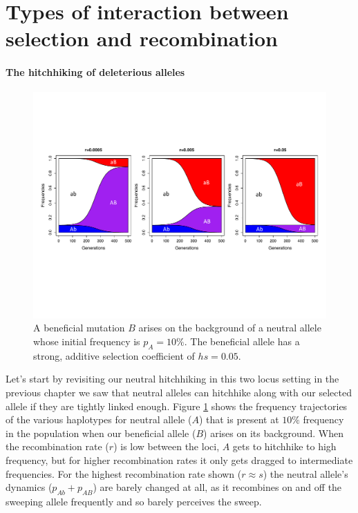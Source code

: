 \section{Types of interaction between selection and recombination}

\paragraph{The hitchhiking of deleterious alleles}
\begin{figure}
\begin{center}
  \includegraphics[width = 0.9 \textwidth]{figures/selection_recom_interaction/Neutral_Hitchhiking_labeled.pdf}
\end{center}
\caption{A beneficial mutation $B$ arises on the background of a neutral allele whose initial frequency is $p_A=10\%$. The beneficial allele has a strong, additive selection coefficient of $hs=0.05$.} \label{fig:Neutral_HH}  %
\end{figure}
Let's start by revisiting our neutral hitchhiking in this two locus setting in the previous chapter we saw that neutral alleles can hitchhike along with our selected allele if they are tightly linked enough. Figure \ref{fig:Neutral_HH}  shows the frequency trajectories of the various haplotypes for neutral allele ($A$) that is present at $10\%$ frequency in the population when our beneficial allele ($B$) arises on its background. When the recombination rate ($r$) is low between the loci, $A$ gets to hitchhike to high frequency, but for higher recombination rates it only gets dragged to intermediate frequencies. For the highest recombination rate shown ($r \approx s$) the neutral allele's dynamics ($p_{Ab}+p_{AB}$) are barely changed at all, as it recombines on and off the sweeping allele frequently and so barely perceives the sweep. 

